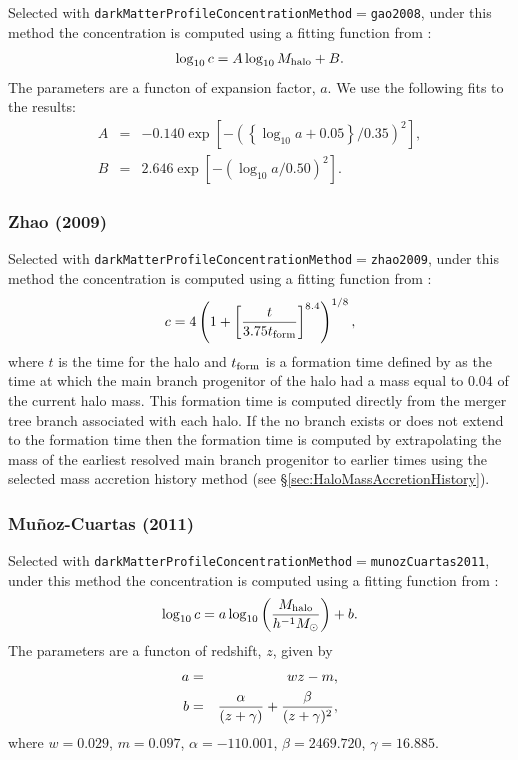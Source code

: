 Selected with {\tt darkMatterProfileConcentrationMethod}$=${\tt gao2008}, under this method the concentration is computed using a fitting function from \cite{gao_redshift_2008}:
\begin{equation}
\log_{10} c = A \log_{10} M_{\rm halo} + B.
\end{equation}
The parameters are a functon of expansion factor, $a$. We use the following fits to the \cite{gao_redshift_2008} results:
\begin{eqnarray}
A &=& -0.140 \exp\left[-\left(\left\{\log_{10}a+0.05\right\}/0.35\right)^2\right], \\
B &=&  2.646 \exp\left[-\left(\log_{10}a/0.50\right)^2\right].
\end{eqnarray}

\subsubsection{Zhao (2009)}\label{phys:darkMatterProfileConcentration:darkMatterProfileConcentrationZhao2009}

Selected with {\tt darkMatterProfileConcentrationMethod}$=${\tt zhao2009}, under this method the concentration is computed using a fitting function from \cite{zhao_accurate_2009}:
\begin{equation}
 c = 4 \left(1 + \left[ {t  \over 3.75 t_{\rm form}}\right]^{8.4}\right)^{1/8},
\end{equation}
where $t$ is the time for the halo and $t_{\rm form}$ is a formation time defined by \cite{zhao_accurate_2009} as the time at which the main branch progenitor of the halo had a mass equal to $0.04$ of the current halo mass. This formation time is computed directly from the merger tree branch associated with each halo. If the no branch exists or does not extend to the formation time then the formation time is computed by extrapolating the mass of the earliest resolved main branch progenitor to earlier times using the selected mass accretion history method (see \S\ref{sec:HaloMassAccretionHistory}).

\subsubsection{Mu\~noz-Cuartas (2011)}\label{phys:darkMatterProfileConcentration:darkMatterProfileConcentrationMunozCuartas2011}

Selected with {\tt darkMatterProfileConcentrationMethod}$=${\tt munozCuartas2011}, under this method the concentration is computed using a fitting function from \cite{munoz-cuartas_redshift_2011}:
\begin{equation}
\log_{10} c = a \log_{10} \left( {M_{\rm halo} \over h^{-1}M_\odot} \right) + b.
\end{equation}
The parameters are a functon of redshift, $z$, given by
\begin{eqnarray}
a &=& wz-m, \\
b &=& {\alpha \over (z+\gamma)} + {\beta \over (z+\gamma)^2},
\end{eqnarray}
where $w=0.029$, $m=0.097$, $\alpha=-110.001$, $\beta=2469.720$, $\gamma=16.885$.

